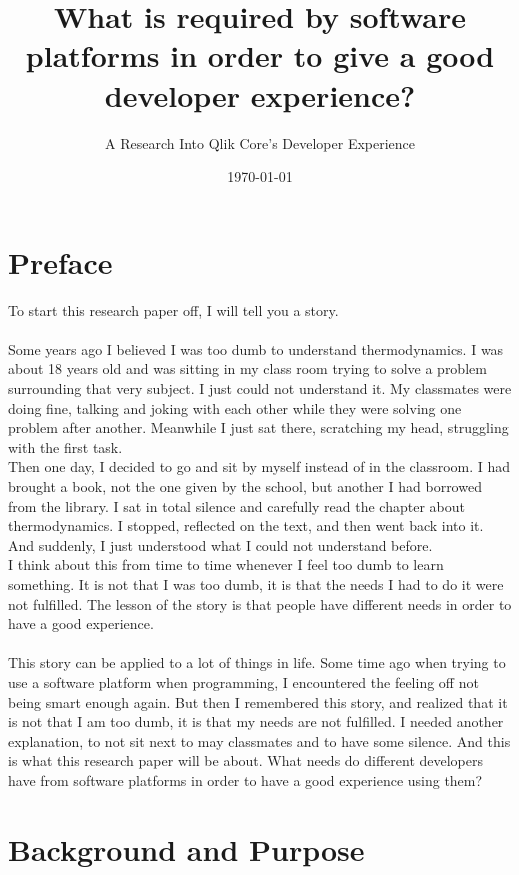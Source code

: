 \documentclass{cslthse-msc}
\title{What is required by software platforms in order to give a good developer experience?}
\subtitle{A Research Into Qlik Core's Developer Experience}
\date{\today}
\begin{document}
    \makefrontmatter
    \chapter*{Preface}
    To start this research paper off, I will tell you a story.\\\\
    Some years ago I believed I was too dumb to understand thermodynamics. I was about 18 years old and was sitting in my class room trying to solve a problem surrounding that very subject. I just could not understand it. My classmates were doing fine, talking and joking with each other while they were solving one problem after another. Meanwhile I just sat there, scratching my head, struggling with the first task.\\
    Then one day, I decided to go and sit by myself instead of in the classroom. I had brought a book, not the one given by the school, but another I had borrowed from the library. I sat in total silence and carefully read the chapter about thermodynamics. I stopped, reflected on the text, and then went back into it. And suddenly, I just understood what I could not understand before.\\
    I think about this from time to time whenever I feel too dumb to learn something. It is not that I was too dumb, it is that the needs I had to do it were not fulfilled. The lesson of the story is that people have different needs in order to have a good experience.\\\\
    This story can be applied to a lot of things in life. Some time ago when trying to use a software platform when programming, I encountered the feeling off not being smart enough again. But then I remembered this story, and realized that it is not that I am too dumb, it is that my needs are not fulfilled. I needed another explanation, to not sit next to may classmates and to have some silence. And this is what this research paper will be about. What needs do different developers have from software platforms in order to have a good experience using them?
    \chapter{Background and Purpose}
\end{document}
